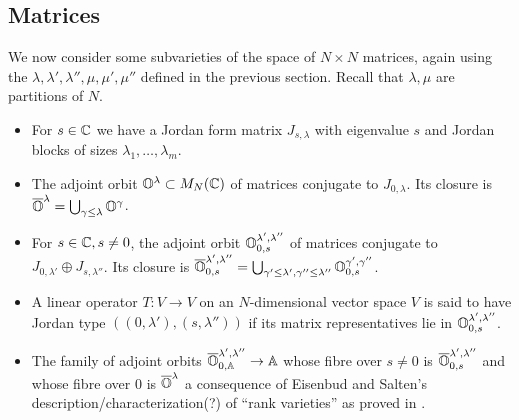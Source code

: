 \documentclass[draft]{article}
\begin{document}
    

\subsection{Matrices}
 We now consider some subvarieties of the space of $ N\times N$ matrices, again using the $ \lambda, \lambda', \lambda'', \mu, \mu', \mu''$ defined in the previous section.  Recall that $\lambda, \mu $ are partitions of $ N$.

\begin{itemize}
    \item For $ s \in \mathbb C$ 
    we have a Jordan form matrix $ J_{s,\lambda}$ with eigenvalue $ s$ and Jordan blocks of sizes $ \lambda_1, \dots, \lambda_m$. 
    \item The adjoint orbit $ \mathbb O^\lambda \subset M_N(\mathbb C)$ of matrices conjugate to $ J_{0,\lambda}$.  Its closure is $ \overline{\mathbb O}^\lambda = \bigcup_{\gamma \le \lambda} \mathbb O^{\gamma}$.
    \item For $ s \in \mathbb C, s \ne 0$, the adjoint orbit $ \mathbb O^{\lambda', \lambda''}_{0,s}$ of matrices conjugate to $ J_{0,\lambda'} \oplus J_{s,\lambda''}$.  Its closure is $ \overline{\mathbb O}^{\lambda', \lambda''}_{0,s} = \bigcup_{\gamma' \le \lambda', \gamma'' \le \lambda''} \mathbb O^{\gamma', \gamma''}_{0,s}$. 
    \item A linear operator $ T : V \rightarrow V $ on an $N$-dimensional vector space $V$ is said to have Jordan type $((0,\lambda'), (s,\lambda''))$ if its matrix representatives lie in $ \mathbb O^{\lambda', \lambda''}_{0,s}$.
    \item The family of adjoint orbits $ \overline{\mathbb O}^{\lambda', \lambda''}_{0,\mathbb A} \rightarrow \mathbb A$ whose fibre over $ s \ne 0 $ is $ \overline{\mathbb O}^{\lambda', \lambda''}_{0,s}$ and whose fibre over 0 is $\overline{\mathbb O}^\lambda$ a consequence of Eisenbud and Salten's description/characterization(?) of ``rank varieties'' as proved in .
    
    

\end{itemize}
\end{document}
